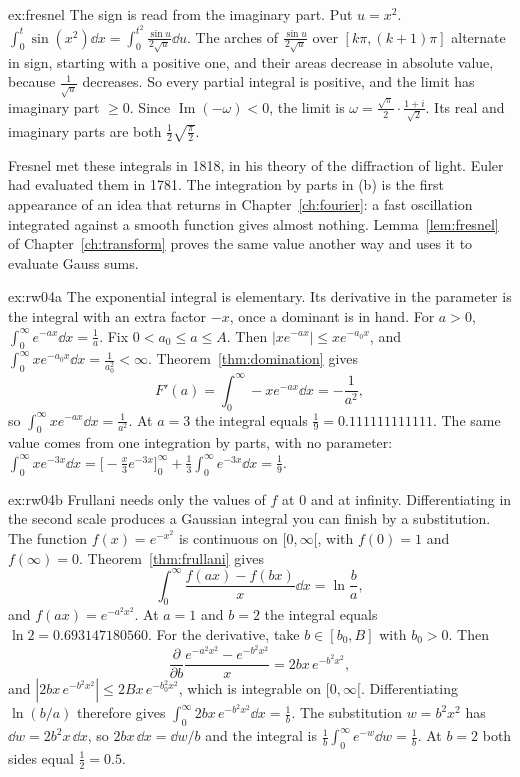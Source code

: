 \begin{solution}{ex:fresnel}
The sign is read from the imaginary part. Put $u=x^2$. $\int_0^t\sin(x^2)\dd x=\int_0^{t^2}\frac{\sin u}{2\sqrt u}\dd u$. The arches of $\frac{\sin u}{2\sqrt u}$ over
$[k\pi,(k+1)\pi]$ alternate in sign, starting with a positive one, and their areas decrease in absolute value, because $\frac1{\sqrt u}$ decreases. So every partial
integral is positive, and the limit has imaginary part $\ge0$. Since $\operatorname{Im}(-\omega)<0$, the limit is $\omega=\frac{\sqrt\pi}2\cdot\frac{1+i}{\sqrt2}$. Its real
and imaginary parts are both $\frac12\sqrt{\frac\pi2}$.

\leads Fresnel met these integrals in 1818, in his theory of the diffraction of light. Euler had evaluated them in 1781.
The integration by parts in (b) is the first appearance of an idea that returns in Chapter~\ref{ch:fourier}: a fast oscillation integrated against a smooth
function gives almost nothing. Lemma~\ref{lem:fresnel} of Chapter~\ref{ch:transform} proves the same value another way and uses it to evaluate Gauss sums.
\end{solution}

\begin{solution}{ex:rw04a}
\idea The exponential integral is elementary. Its derivative in the parameter is the integral with an extra factor $-x$, once a dominant is in hand.
\writeup For $a>0$, $\int_0^\infty e^{-ax}\dd x=\frac1a$. Fix $0<a_0\le a\le A$. Then $|xe^{-ax}|\le xe^{-a_0x}$, and $\int_0^\infty xe^{-a_0x}\dd x=\frac1{a_0^2}<\infty$. Theorem~\ref{thm:domination} gives
\[
F'(a)=\int_0^\infty -xe^{-ax}\dd x=-\frac1{a^2},
\]
so $\int_0^\infty xe^{-ax}\dd x=\frac1{a^2}$. At $a=3$ the integral equals $\frac19=0.111111111111$. The same value comes from one integration by parts, with no parameter: $\int_0^\infty xe^{-3x}\dd x=\bigl[- \frac x3 e^{-3x}\bigr]_0^\infty+\frac13\int_0^\infty e^{-3x}\dd x=\frac19$.
\end{solution}

\begin{solution}{ex:rw04b}
\idea Frullani needs only the values of $f$ at $0$ and at infinity. Differentiating in the second scale produces a Gaussian integral you can finish by a substitution.
\writeup The function $f(x)=e^{-x^2}$ is continuous on $[0,\infty[$, with $f(0)=1$ and $f(\infty)=0$. Theorem~\ref{thm:frullani} gives
\[
\int_0^\infty\frac{f(ax)-f(bx)}x\dd x=\ln\frac ba,
\]
and $f(ax)=e^{-a^2x^2}$. At $a=1$ and $b=2$ the integral equals $\ln 2=0.693147180560$. For the derivative, take $b\in[b_0,B]$ with $b_0>0$. Then
\[
\frac{\partial}{\partial b}\frac{e^{-a^2x^2}-e^{-b^2x^2}}x=2bx\,e^{-b^2x^2},
\]
and $|2bx\,e^{-b^2x^2}|\le 2Bx\,e^{-b_0^2x^2}$, which is integrable on $[0,\infty[$. Differentiating $\ln(b/a)$ therefore gives $\int_0^\infty 2bx\,e^{-b^2x^2}\dd x=\frac1b$. The substitution $w=b^2x^2$ has $\dd w=2b^2x\,\dd x$, so $2bx\,\dd x=\dd w/b$ and the integral is $\frac1b\int_0^\infty e^{-w}\dd w=\frac1b$. At $b=2$ both sides equal $\frac12=0.5$.
\end{solution}

